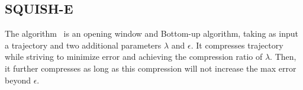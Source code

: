 
\subsection{SQUISH-E}



The \squishe algorithm~\cite{Muckell:Compression} is an {opening} window and Bottom-up algorithm, taking as input a trajectory  and two additional parameters $\lambda$ and $\epsilon$.
It compresses trajectory  while striving to minimize \sed error and achieving the compression ratio of $\lambda$. Then, it further compresses  as long as this compression will not increase the max \sed error beyond $\epsilon$.


